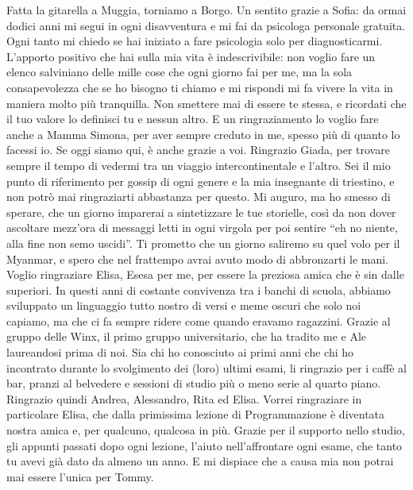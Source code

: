 \newline
Fatta la gitarella a Muggia, torniamo a Borgo. Un sentito grazie a Sofia: da ormai dodici anni mi segui in ogni disavventura e mi fai da psicologa personale gratuita. Ogni tanto mi chiedo se hai iniziato a fare psicologia solo per diagnosticarmi. L'apporto positivo che hai sulla mia vita è indescrivibile: non voglio fare un elenco salviniano delle mille cose che ogni giorno fai per me, ma la sola consapevolezza che se ho bisogno ti chiamo e mi rispondi mi fa vivere la vita in maniera molto più tranquilla. Non smettere mai di essere te stessa, e ricordati che il tuo valore lo definisci tu e nessun altro. E un ringraziamento lo voglio fare anche a Mamma Simona, per aver sempre creduto in me, spesso più di quanto lo facessi io. Se oggi siamo qui, è anche grazie a voi.
\newline
Ringrazio Giada, per trovare sempre il tempo di vedermi tra un viaggio intercontinentale e l'altro. Sei il mio punto di riferimento per gossip di ogni genere e la mia insegnante di triestino, e non potrò mai ringraziarti abbastanza per questo. Mi auguro, ma ho smesso di sperare, che un giorno imparerai a sintetizzare le tue storielle, così da non dover ascoltare mezz'ora di messaggi letti in ogni virgola per poi sentire ``eh no niente, alla fine non semo uscidi''. Ti prometto che un giorno saliremo su quel volo per il Myanmar, e spero che nel frattempo avrai avuto modo di abbronzarti le mani.
\newline
Voglio ringraziare Elisa, Esesa per me, per essere la preziosa amica che è sin dalle superiori. In questi anni di costante convivenza tra i banchi di scuola, abbiamo sviluppato un linguaggio tutto nostro di versi e meme oscuri che solo noi capiamo, ma che ci fa sempre ridere come quando eravamo ragazzini.
\newline
Grazie al gruppo delle Winx, il primo gruppo universitario, che ha tradito me e Ale laureandosi prima di noi. Sia chi ho conosciuto ai primi anni che chi ho incontrato durante lo svolgimento dei (loro) ultimi esami, li ringrazio per i caffè al bar, pranzi al belvedere e sessioni di studio più o meno serie al quarto piano. Ringrazio quindi Andrea, Alessandro, Rita ed Elisa.
\newline
Vorrei ringraziare in particolare Elisa, che dalla primissima lezione di Programmazione è diventata nostra amica e, per qualcuno, qualcosa in più. Grazie per il supporto nello studio, gli appunti passati dopo ogni lezione, l'aiuto nell'affrontare ogni esame, che tanto tu avevi già dato da almeno un anno. E mi dispiace che a causa mia non potrai mai essere l'unica per Tommy.
